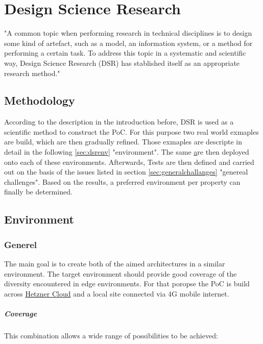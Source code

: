\documentclass[MSC,Master,english]{twbook}%
\begin{document}
\chapter{Design Science Research}
\label{chap:dsr}
"A common topic when performing research in technical disciplines is to design some kind of artefact, such as a model, an information system, or a method for performing a certain task. To address this topic in a systematic and scientific way, Design Science Research (DSR) has stablished itself as an appropriate research method." \cite{dsr-method}

\section{Methodology}
\label{sec:dsrmethode}
According to the description in the introduction before, \ac{DSR} is used as a scientific method to construct the \ac{PoC}. For this purpose two real world exmaples are build, which are then gradually refined. Those exmaples are descripte in detail in the following \autoref{sec:dsrenv} "environment". The same \hyperref[sec:dsrusecase] are then deployed onto each of these environments. Afterwards, Tests are then defined and carried out on the basis of the issues listed in section \autoref{sec:generalchallanges} "genereal challenges". Based on the results, a preferred environment per property can finally be determined.

\section{Environment}
\label{sec:dsrenv}
\subsection{Generel}
The main goal is to create both of the aimed architectures in a similar environment. The target environment should provide good coverage of the diversity encountered in edge environments. For that poropse the \ac{PoC} is build across \hyperref{https://www.hetzner.com/cloud}{}{}{Hetzner Cloud} and a local site connected via 4G mobile internet.

\paragraph{Coverage} This combination allows a wide range of possibilities to be achieved:
\end{document}

